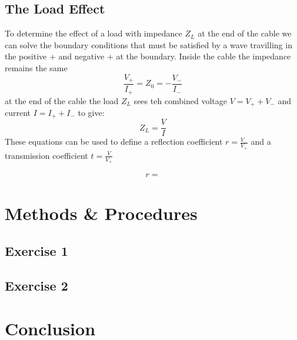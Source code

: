 \documentclass{article} %
\begin{document}
\subsection{The Load Effect}

To determine the effect of a load with impedance $Z_L$ at the end of the cable we can solve the boundary conditions that must be satisfied by a wave travilling in the positive + and negative + at the boundary.
Inside the cable the impedance remains the same
\[
\frac{V_+}{I_+} = Z_0 = - \frac{V_-}{I_-}
\]
at the end of the cable the load $Z_L$ sees teh combined voltage $V = V_+ + V_-$ and current $I = I_+ + I_-$ to give:
\[
Z_L = \frac{V}{I}
\]
These equations can be used to define a reflection coefficient $r = \frac{V_-}{V_+}$ and a transmission coefficient $t = \frac{V}{V_+}$

\begin{align*}
    r = 
\end{align*}

\section{Methods \& Procedures}

\subsection{Exercise 1}

\subsection{Exercise 2}

\section{Conclusion}

\label{last_page}

\newpage
% 
% 
\end{document}
